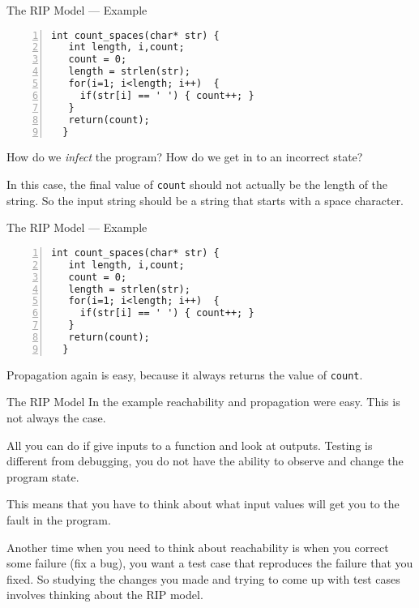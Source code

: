 \documentclass[handout]{beamer}
\begin{document}
\begin{frame}[fragile]{The RIP Model --- Example}
  \begin{lstlisting}[numbers=left]
  int count_spaces(char* str) {
   int length, i,count;
   count = 0;
   length = strlen(str);
   for(i=1; i<length; i++)  { 
     if(str[i] == ' ') { count++; }
   }
   return(count);
  }
\end{lstlisting}
How do we {\em infect} the program? How do we get in to an incorrect state?

In this case, the final  value of {\tt count} should not actually be
the length of the string. So the input string should be a string that
starts with a space character. 
\end{frame}

\begin{frame}[fragile]{The RIP Model --- Example}
  \begin{lstlisting}[numbers=left]
  int count_spaces(char* str) {
   int length, i,count;
   count = 0;
   length = strlen(str);
   for(i=1; i<length; i++)  { 
     if(str[i] == ' ') { count++; }
   }
   return(count);
  }
\end{lstlisting}
Propagation again is easy, because it always returns the value of {\tt count}.
\end{frame}

\begin{frame}{The RIP Model}
  In the example reachability and propagation were easy. This is not
  always the case.

 All you can do if give inputs to a function and look at
 outputs. Testing is different from debugging, you do not have the
 ability to observe and change the program state.

 This means that you have to think about what input values will get
 you to the fault in the program.

 Another time when you need to think about reachability is when you
 correct some failure (fix a bug), you want a test case that
 reproduces the failure that you fixed. So studying the changes you
 made and trying to come up with test cases involves thinking about
 the RIP model. 
  
\end{frame}
\end{document}
